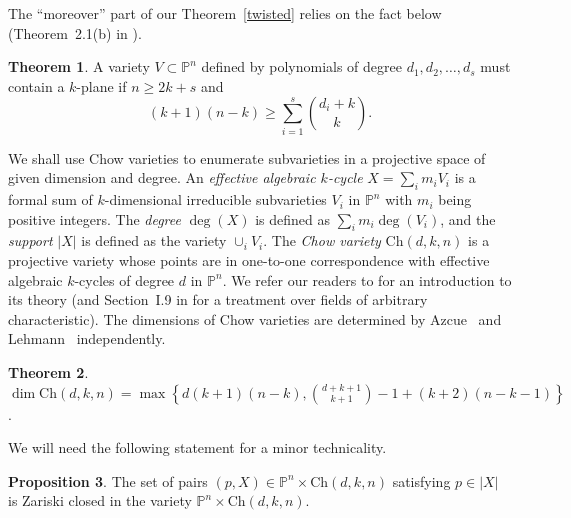 \documentclass[11pt]{article}
\theoremstyle{definition}
\newtheorem{theorem}{Theorem}[section]
\newtheorem{proposition}[theorem]{Proposition}
\begin{document}
The ``moreover'' part of our Theorem~\ref{twisted} relies on the fact below (Theorem~2.1(b) in \cite{debarre1998vari}).
\begin{theorem}\label{fano}
    A variety $V \subset \mathbb{P}^n$ defined by polynomials of degree $d_1,d_2,\dots,d_s$ must contain a $k$-plane if $n \geq 2k + s$ and \begin{equation*}
        (k+1)(n-k) \geq \sum_{i=1}^s \binom{d_i+k}{k}.
    \end{equation*}
\end{theorem}

We shall use Chow varieties to enumerate subvarieties in a projective space of given dimension and degree. An \textit{effective algebraic $k$-cycle} $X = \sum_i m_iV_i$ is a formal sum of $k$-dimensional irreducible subvarieties $V_i$ in $\mathbb{P}^n$ with $m_i$ being positive integers. The \textit{degree} $\deg(X)$ is defined as $\sum_i m_i\deg(V_i)$, and the \textit{support} $|X|$ is defined as the variety $\cup_i V_i$. The \textit{Chow variety} $\text{Ch}(d,k,n)$ is a projective variety whose points are in one-to-one correspondence with effective algebraic $k$-cycles of degree $d$ in $\mathbb{P}^n$. We refer our readers to \cite{gelfand1994discriminants} for an introduction to its theory (and Section~I.9 in \cite{samuel1967} for a treatment over fields of arbitrary characteristic). The dimensions of Chow varieties are determined by Azcue~\cite{azcue1992dimension} and Lehmann~\cite{lehmann2017asymptotic} independently.
\begin{theorem}\label{chow}
    $\dim \text{Ch}(d,k,n) =\max \left\{ d(k+1)(n-k), \binom{d+k+1}{k+1}-1 + (k+2)(n-k-1) \right\}$.
\end{theorem}

We will need the following statement for a minor technicality.
\begin{proposition}\label{fineorcoarse}
    The set of pairs $(p,X) \in \mathbb{P}^n \times \text{Ch}(d,k,n)$ satisfying $p \in |X|$ is Zariski closed in the variety $\mathbb{P}^n \times \text{Ch}(d,k,n)$.
\end{proposition}
\end{document}
